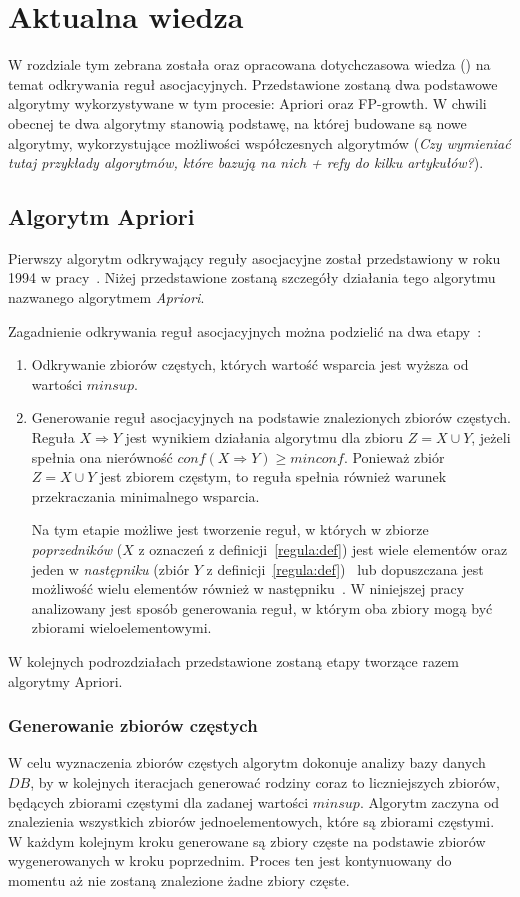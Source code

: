 \section{Aktualna wiedza}
W rozdziale tym zebrana została oraz opracowana dotychczasowa wiedza () na temat odkrywania reguł asocjacyjnych. Przedstawione zostaną dwa podstawowe algorytmy wykorzystywane w tym procesie: Apriori oraz FP-growth. W chwili obecnej te dwa algorytmy stanowią podstawę, na której budowane są nowe algorytmy, wykorzystujące możliwości współczesnych algorytmów (\emph{Czy wymieniać tutaj przykłady algorytmów, które bazują na nich + refy do kilku artykułów?}).

\subsection{Algorytm Apriori}\label{apriori:section}
Pierwszy algorytm odkrywający reguły asocjacyjne został przedstawiony w roku 1994 w pracy~\cite{Apriori:Main}. Niżej przedstawione zostaną szczegóły działania tego algorytmu nazwanego algorytmem \emph{Apriori}.

Zagadnienie odkrywania reguł asocjacyjnych można podzielić na dwa etapy~\cite{Problem:Statement}:
\begin{enumerate}
	\item Odkrywanie zbiorów częstych, których wartość wsparcia jest wyższa od wartości $minsup$.
	\item Generowanie reguł asocjacyjnych na podstawie znalezionych zbiorów częstych. Reguła $X \Rightarrow Y$ jest wynikiem działania algorytmu dla zbioru $Z = X \cup Y$, jeżeli spełnia ona nierówność $conf(X \Rightarrow Y) \geq minconf$. Ponieważ zbiór $Z = X \cup Y$ jest zbiorem częstym, to reguła spełnia również warunek przekraczania minimalnego wsparcia.

	Na tym etapie możliwe jest tworzenie reguł, w których w zbiorze \emph{poprzedników} ($X$ z oznaczeń z definicji~\ref{regula:def}) jest wiele elementów oraz jeden w \emph{następniku} (zbiór $Y$ z definicji~\ref{regula:def})~\cite{Problem:Statement} lub dopuszczana jest możliwość wielu elementów również w następniku~\cite{Apriori:Main}. W niniejszej pracy analizowany jest sposób generowania reguł, w którym oba zbiory mogą być zbiorami wieloelementowymi.
\end{enumerate}

W kolejnych podrozdziałach przedstawione zostaną etapy tworzące razem algorytmy Apriori.

\subsubsection{Generowanie zbiorów częstych}\label{apriori:gen}
W celu wyznaczenia zbiorów częstych algorytm dokonuje analizy bazy danych $DB$, by w kolejnych iteracjach generować rodziny coraz to liczniejszych zbiorów, będących zbiorami częstymi dla zadanej wartości $minsup$. Algorytm zaczyna od znalezienia wszystkich zbiorów jednoelementowych, które są zbiorami częstymi. W każdym kolejnym kroku generowane są zbiory częste na podstawie zbiorów wygenerowanych w kroku poprzednim. Proces ten jest kontynuowany do momentu aż nie zostaną znalezione żadne zbiory częste.

